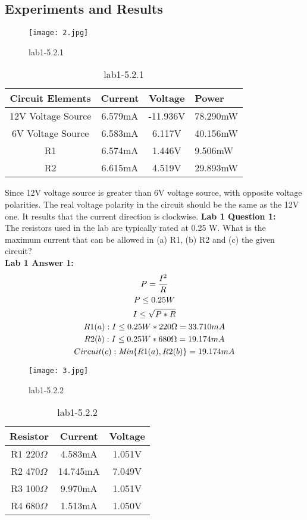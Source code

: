 \documentclass[12pt,fleqn]{article}
\begin{document}
\subsection{Experiments and Results}
\begin{figure}[H]
\centering
\texttt{[image: 2.jpg]}
\caption{lab1-5.2.1}
\end{figure}
\begin{table}[H]
  \centering
  \begin{tabular}{| c | c | c | l |}
    \hline
    \textbf{Circuit Elements} & \textbf{Current} & \textbf{Voltage} & \textbf{Power} \\ \hline
    12V Voltage Source & 6.579mA & -11.936V & 78.290mW \\
    \hline
    6V Voltage Source & 6.583mA & 6.117V & 40.156mW \\
    \hline
    R1 & 6.574mA & 1.446V & 9.506mW \\
    \hline
    R2 & 6.615mA & 4.519V & 29.893mW \\
    \hline
  \end{tabular}
  \caption{lab1-5.2.1}
\end{table}
Since 12V voltage source is greater than 6V voltage source, with opposite voltage polarities. The real voltage polarity in the circuit should be the same as the 12V one. It results that the current direction is clockwise.
\textbf{Lab 1 Question 1:}
\\The resistors used in the lab are typically rated at 0.25 W. What is the maximum current that can be allowed in (a) R1, (b) R2 and (c) the given circuit?\\
\textbf{Lab 1 Answer 1:}
\begin{gather}
P = \frac{I^2}{R}\\
P \leq 0.25W\\
I \leq \sqrt{P*R}\\
R1(a) : I \leq {0.25W * 220\Omega} = 33.710mA\\
R2(b) : I \leq {0.25W * 680\Omega} = 19.174mA\\
Circuit(c) : \emph{Min}\{R1(a), R2(b)\} = 19.174mA
\end{gather}
\begin{figure}[H]
\centering
\texttt{[image: 3.jpg]}
\caption{lab1-5.2.2}
\end{figure}
\begin{table}[H]
  \centering
  \begin{tabular}{| c | c | c |}
    \hline
    \textbf{Resistor} & \textbf{Current} & \textbf{Voltage}\\
    \hline
    R1 220\ensuremath{\Omega} & 4.583mA & 1.051V \\
    \hline
    R2 470\ensuremath{\Omega} & 14.745mA & 7.049V \\ 
    \hline
    R3 100\ensuremath{\Omega} & 9.970mA & 1.051V \\
    \hline
    R4 680\ensuremath{\Omega} & 1.513mA & 1.050V \\
    \hline
  \end{tabular}
  \caption{lab1-5.2.2}
\end{table}
\end{document}

